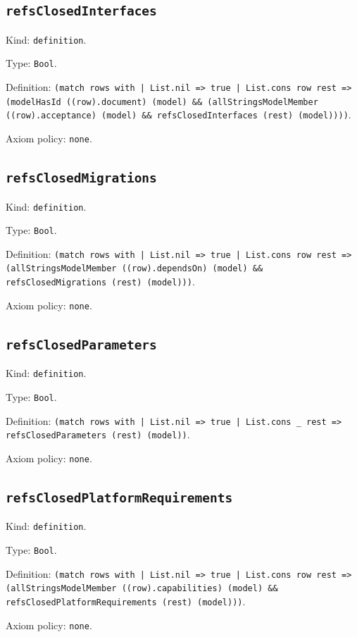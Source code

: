 \documentclass[11pt]{article}
\begin{document}
\subsection*{\texttt{refsClosedInterfaces}}
\noindent Kind: \texttt{definition}.\par
\noindent Type: \texttt{Bool}.\par
\noindent Definition: \texttt{(match rows with | List.nil => true | List.cons row rest => (modelHasId ((row).document) (model) \&\& (allStringsModelMember ((row).acceptance) (model) \&\& refsClosedInterfaces (rest) (model))))}.\par
\noindent Axiom policy: \texttt{none}.\par
\subsection*{\texttt{refsClosedMigrations}}
\noindent Kind: \texttt{definition}.\par
\noindent Type: \texttt{Bool}.\par
\noindent Definition: \texttt{(match rows with | List.nil => true | List.cons row rest => (allStringsModelMember ((row).dependsOn) (model) \&\& refsClosedMigrations (rest) (model)))}.\par
\noindent Axiom policy: \texttt{none}.\par
\subsection*{\texttt{refsClosedParameters}}
\noindent Kind: \texttt{definition}.\par
\noindent Type: \texttt{Bool}.\par
\noindent Definition: \texttt{(match rows with | List.nil => true | List.cons \_ rest => refsClosedParameters (rest) (model))}.\par
\noindent Axiom policy: \texttt{none}.\par
\subsection*{\texttt{refsClosedPlatformRequirements}}
\noindent Kind: \texttt{definition}.\par
\noindent Type: \texttt{Bool}.\par
\noindent Definition: \texttt{(match rows with | List.nil => true | List.cons row rest => (allStringsModelMember ((row).capabilities) (model) \&\& refsClosedPlatformRequirements (rest) (model)))}.\par
\noindent Axiom policy: \texttt{none}.\par
\end{document}
